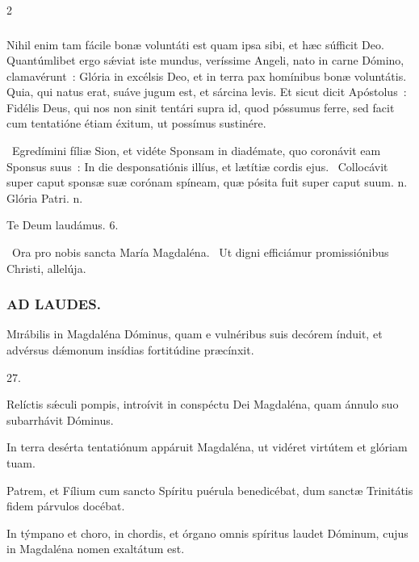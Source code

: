 \documentclass[9pt,twoside]{extarticle}
\begin{document}
\begin{multicols}{2}
{{{\subsubsection*{\center {}}
Nihil enim tam fácile bonæ voluntáti est quam ipsa sibi, et hæc súfficit Deo. Quantúmlibet ergo sǽviat iste mundus, veríssime Angeli, nato in carne Dómino, clamavérunt~: Glória in excélsis Deo, et in terra pax homínibus bonæ voluntátis. Quia, qui natus erat, suáve jugum est, et sárcina levis. Et sicut dicit Apóstolus~: Fidélis Deus, qui nos non sinit tentári supra id, quod póssumus ferre, sed facit cum tentatióne étiam éxitum, ut possímus sustinére.

\begin{tightlist}{}
\item {}~Egredímini fíliæ Sion, et vidéte Sponsam in diadémate, quo coronávit eam Sponsus suus~: \textred{*} In die desponsatiónis illíus, et lætítiæ cordis ejus. ~Collocávit super caput sponsæ suæ corónam spíneam, quæ pósita fuit super caput suum. n. Glória Patri. n.
\item Te Deum laudámus. 6.
\item {}~Ora pro nobis sancta María Magdaléna. ~Ut digni efficiámur promissiónibus Christi, allelúja.
\end{tightlist}

\subsubsection*{\center \textsc{AD LAUDES.}}
\begin{center}\end{center}
\lettrine{M}irábilis in Magdaléna Dóminus, quam e vulnéribus suis decórem índuit, et advérsus dǽmonum insídias fortitúdine præcínxit.

\begin{tightlist}{}
\item {} 27.
\item {} Relíctis sǽculi pompis, introívit in conspéctu Dei Magdaléna, quam ánnulo suo subarrhávit Dóminus.
\item {} In terra desérta tentatiónum appáruit Magdaléna, ut vidéret virtútem et glóriam tuam.
\item {} Patrem, et Fílium cum sancto Spíritu puérula benedicébat, dum sanctæ Trinitátis fidem párvulos docébat.
\item {} In týmpano et choro, in chordis, et órgano omnis spíritus laudet Dóminum, cujus in Magdaléna nomen exaltátum est.
\end{tightlist}

}}}
\end{multicols}
\end{document}
